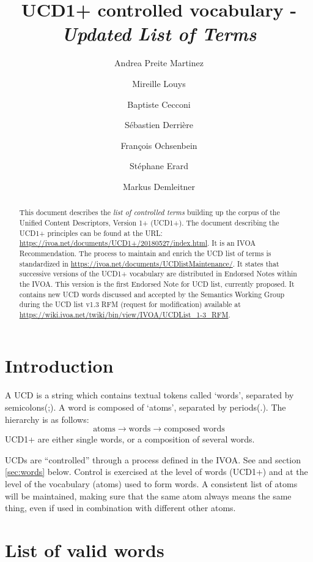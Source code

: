 \documentclass[11pt,a4paper]{ivoa}
\title{UCD1+ controlled vocabulary - \emph{Updated List of Terms}}
\author{Andrea Preite Martinez}
\author{Mireille Louys}
\author{Baptiste Cecconi}
\author{S\'ebastien Derri\`ere}
\author{Fran\c cois Ochsenbein}
\author{St\'ephane Erard}
\author{Markus Demleitner}
\begin{document}
\begin{abstract}
This document describes the \emph{list of controlled terms}  building up the corpus of the Unified 
Content Descriptors, Version 1+ (UCD1+).  The document describing the UCD1+ principles can be found at 
the URL: \url{https://ivoa.net/documents/UCD1+/20180527/index.html}.  It is an IVOA Recommendation. 
The process to maintain and enrich the UCD list of terms is standardized in 
\url{https://ivoa.net/documents/UCDlistMaintenance/}.  It states that successive versions of the UCD1+ 
vocabulary are distributed in Endorsed Notes within the IVOA.  This version is the first Endorsed Note 
for UCD list, currently proposed.  It contains new UCD words discussed and accepted by the Semantics 
Working Group during the UCD list v1.3 RFM (request for modification) available at 
\url{https://wiki.ivoa.net/twiki/bin/view/IVOA/UCDList_1-3_RFM}.

\end{abstract} 

\section{Introduction}

A UCD is a string which contains textual tokens called `words', separated by semicolons(;). A word is 
composed of `atoms', separated by periods(.). The hierarchy is as follows: 
$$
\textrm{atoms} \rightarrow \textrm{words} \rightarrow \textrm{composed words}
$$
UCD1+ are either single words, or a composition of several words.

UCDs are ``controlled'' through a process defined in the IVOA. See \citet{2005ivoa.spec.0819D} and 
section \ref{sec:words} below. Control is exercised at the level of words (UCD1+) and at the level 
of the vocabulary (atoms) used to form words. A consistent list of atoms will be maintained, making 
sure that the same atom always means the same thing, even if used in combination with different other 
atoms. 


\section{List of valid words}
\label{sec:list}
\end{document}
